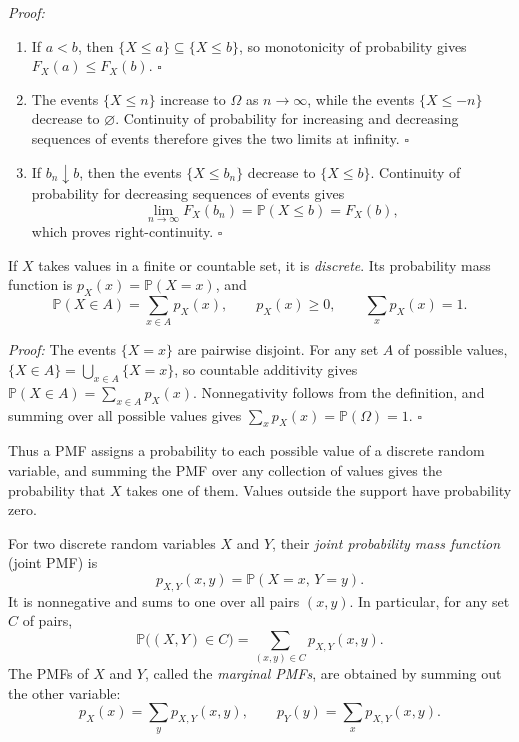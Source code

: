 \documentclass[a4paper,11pt,abstracton]{scrartcl}
\theoremstyle{dotlessP}
\theoremstyle{dotlessS}
\theoremstyle{remark}
\theoremstyle{definition}
\begin{document}
\begin{claim_box}
\textit{Proof:}
\begin{enumerate}
\item If $a<b$, then $\{X\leq a\}\subseteq\{X\leq b\}$, so monotonicity of probability gives $F_X(a)\leq F_X(b)$.
\hfill$\square$
\item The events $\{X\leq n\}$ increase to $\Omega$ as $n\to\infty$, while the events $\{X\leq -n\}$ decrease to $\varnothing$. Continuity of probability for increasing and decreasing sequences of events therefore gives the two limits at infinity.
\hfill$\square$
\item If $b_n\downarrow b$, then the events $\{X\leq b_n\}$ decrease to $\{X\leq b\}$. Continuity of probability for decreasing sequences of events gives
\[
  \lim_{n\to\infty}F_X(b_n)
  =\mathbb{P}(X\leq b)
  =F_X(b),
\]
which proves right-continuity.
\hfill$\square$
\end{enumerate}
\end{claim_box}

\begin{problem_box}
If $X$ takes values in a finite or countable set, it is \emph{discrete}. Its probability mass function is $p_X(x)=\mathbb{P}(X=x)$, and
\[
  \mathbb{P}(X\in A)=\sum_{x\in A}p_X(x),
  \qquad p_X(x)\geq0,\qquad \sum_x p_X(x)=1.
\]
\end{problem_box}

\begin{claim_box}
\textit{Proof:} The events $\{X=x\}$ are pairwise disjoint. For any set $A$ of possible values, $\{X\in A\}=\bigcup_{x\in A}\{X=x\}$, so countable additivity gives $\mathbb{P}(X\in A)=\sum_{x\in A}p_X(x)$. Nonnegativity follows from the definition, and summing over all possible values gives $\sum_xp_X(x)=\mathbb{P}(\Omega)=1$.
\hfill$\square$
\end{claim_box}
Thus a PMF assigns a probability to each possible value of a discrete random variable, and summing the PMF over any collection of values gives the probability that $X$ takes one of them. Values outside the support have probability zero.

For two discrete random variables $X$ and $Y$, their \emph{joint probability mass function} (joint PMF) is
\[
  p_{X,Y}(x,y)=\mathbb{P}(X=x,\,Y=y).
\]
It is nonnegative and sums to one over all pairs $(x,y)$. In particular, for any set $C$ of pairs,
\[
  \mathbb{P}\bigl((X,Y)\in C\bigr)
  =\sum_{(x,y)\in C}p_{X,Y}(x,y).
\]
The PMFs of $X$ and $Y$, called the \emph{marginal PMFs}, are obtained by summing out the other variable:
\[
  p_X(x)=\sum_y p_{X,Y}(x,y),
  \qquad
  p_Y(y)=\sum_x p_{X,Y}(x,y).
\]
\end{document}
